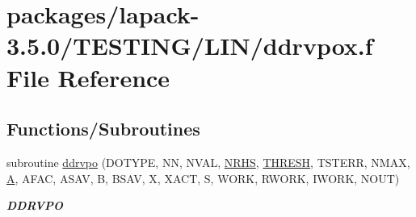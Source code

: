 \hypertarget{ddrvpox_8f}{}\section{packages/lapack-\/3.5.0/\+T\+E\+S\+T\+I\+N\+G/\+L\+I\+N/ddrvpox.f File Reference}
\label{ddrvpox_8f}
\subsection*{Functions/\+Subroutines}
\begin{DoxyCompactItemize}
\item 
subroutine \hyperlink{group__double__lin_ga5cf8f394bfad5f40cbea9f332324313e}{ddrvpo} (D\+O\+T\+Y\+P\+E, N\+N, N\+V\+A\+L, \hyperlink{example__user_8c_aa0138da002ce2a90360df2f521eb3198}{N\+R\+H\+S}, \hyperlink{zlaqgs_8c_a0656018abfc9fa2821827415f5d5ea57}{T\+H\+R\+E\+S\+H}, T\+S\+T\+E\+R\+R, N\+M\+A\+X, \hyperlink{classA}{A}, A\+F\+A\+C, A\+S\+A\+V, B, B\+S\+A\+V, X, X\+A\+C\+T, S, W\+O\+R\+K, R\+W\+O\+R\+K, I\+W\+O\+R\+K, N\+O\+U\+T)
\begin{DoxyCompactList}\small\item\em {\bfseries D\+D\+R\+V\+P\+O} \end{DoxyCompactList}\end{DoxyCompactItemize}
